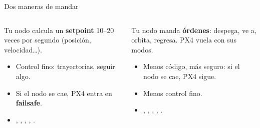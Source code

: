 \begin{frame}{Dos maneras de mandar}
  \begin{columns}[t]
    \begin{idea}[title={\small\bfseries Offboard},coltitle=black,colbacktitle=azulclaro]
      \small Tu nodo calcula un \textbf{setpoint} 10--20 veces por segundo (posición, velocidad\ldots).
      \begin{itemize}
        \item Control fino: trayectorias, seguir algo.
        \item Si el nodo se cae, PX4 entra en \textbf{failsafe}.
        \item {}, , , ,
          .
      \end{itemize}
    \end{idea}
    \begin{idea}[title={\small\bfseries Comandos},coltitle=black,colbacktitle=azulclaro]
      \small Tu nodo manda \textbf{órdenes}: despega, ve a, orbita, regresa. PX4 vuela con sus modos.
      \begin{itemize}
        \item Menos código, más seguro: si el nodo se cae, PX4 sigue.
        \item Menos control fino.
        \item {}, , , ,
          .
      \end{itemize}
    \end{idea}
  \end{columns}
\end{frame}

